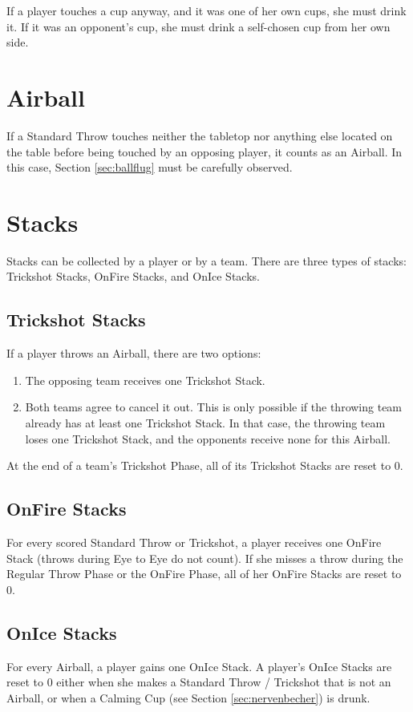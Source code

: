 \documentclass[a5paper, 12pt]{book}
\begin{document}
If a player touches a cup anyway, and it was one of her own cups, she must drink it.  
If it was an opponent’s cup, she must drink a self-chosen cup from her own side.

\section{Airball}\label{sec:airball}
If a Standard Throw touches neither the tabletop nor anything else located on the table before being touched by an opposing player, it counts as an Airball.  
In this case, Section \ref{sec:ballflug} must be carefully observed.

\section{Stacks}\label{sec:stacks}
Stacks can be collected by a player or by a team.  
There are three types of stacks: Trickshot Stacks, OnFire Stacks, and OnIce Stacks.

\subsection{Trickshot Stacks}\label{sec:trickshotstacks}
If a player throws an Airball, there are two options:

\begin{enumerate}
    \item The opposing team receives one Trickshot Stack.
    \item Both teams agree to cancel it out.  
    This is only possible if the throwing team already has at least one Trickshot Stack.  
    In that case, the throwing team loses one Trickshot Stack, and the opponents receive none for this Airball.
\end{enumerate}

At the end of a team’s Trickshot Phase, all of its Trickshot Stacks are reset to 0.

\subsection{OnFire Stacks}\label{sec:onfirestacks}
For every scored Standard Throw or Trickshot, a player receives one OnFire Stack  
(throws during Eye to Eye do not count).  
If she misses a throw during the Regular Throw Phase or the OnFire Phase, all of her OnFire Stacks are reset to 0.

\subsection{OnIce Stacks}\label{sec:onice}
For every Airball, a player gains one OnIce Stack.  
A player’s OnIce Stacks are reset to 0 either when she makes a Standard Throw / Trickshot that is not an Airball,  
or when a Calming Cup (see Section \ref{sec:nervenbecher}) is drunk.
\end{document}
